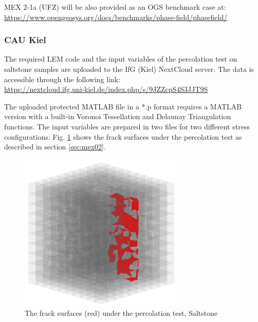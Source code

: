 MEX 2-1a (UFZ) will be also provided as an OGS benchmark case at:\\
\small
\url{https://www.opengeosys.org/docs/benchmarks/phase-field/phasefield/}
\normalsize

\subsubsection*{CAU Kiel}

The required LEM code and the input variables of the percolation test on saltstone samples are uploaded to the IfG (Kiel) NextCloud server. The data is accessible through the following link:\\
\url{https://nextcloud.ifg.uni-kiel.de/index.php/s/9JZZcpS4S3JJT9S}

The uploaded protected MATLAB file in a *.p format requires a MATLAB version with a built-in Voronoi Tessellation and Delaunay Triangulation functions. The input variables are prepared in two files for two different stress configurations. Fig. \ref{fig:Amir_ME2_LEM_b_model_Fracture_Data} shows the frack surfaces under the percolation test as described in section \ref {sec:mex02}.

\begin{figure}[!ht]
\centering
\includegraphics[width=0.7\textwidth]{figures/Amir_ME2_LEM_b_model_Fracture_Data.png}
\caption{The frack surfaces (red) under the percolation test, Saltstone}
\label{fig:Amir_ME2_LEM_b_model_Fracture_Data}
\end{figure}

